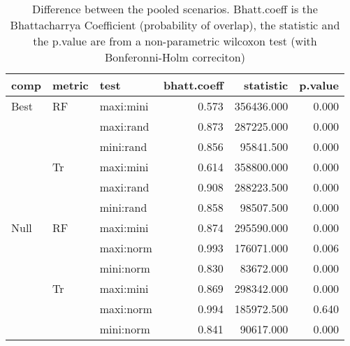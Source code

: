 \begin{table}[ht]
\centering
\begin{tabular}{lllrrr}
  \hline
comp & metric & test & bhatt.coeff & statistic & p.value \\ 
  \hline
Best & RF & maxi:mini & 0.573 & 356436.000 & 0.000 \\ 
   &  & maxi:rand & 0.873 & 287225.000 & 0.000 \\ 
   &  & mini:rand & 0.856 & 95841.500 & 0.000 \\ 
   & Tr & maxi:mini & 0.614 & 358800.000 & 0.000 \\ 
   &  & maxi:rand & 0.908 & 288223.500 & 0.000 \\ 
   &  & mini:rand & 0.858 & 98507.500 & 0.000 \\ 
  Null & RF & maxi:mini & 0.874 & 295590.000 & 0.000 \\ 
   &  & maxi:norm & 0.993 & 176071.000 & 0.006 \\ 
   &  & mini:norm & 0.830 & 83672.000 & 0.000 \\ 
   & Tr & maxi:mini & 0.869 & 298342.000 & 0.000 \\ 
   &  & maxi:norm & 0.994 & 185972.500 & 0.640 \\ 
   &  & mini:norm & 0.841 & 90617.000 & 0.000 \\ 
   \hline
\end{tabular}
\caption{Difference between the pooled scenarios. Bhatt.coeff is the Bhattacharrya Coefficient (probability of overlap), the statistic and the p.value are from a non-parametric wilcoxon test (with Bonferonni-Holm correciton)} 
\label{Full_Tab_pooledscenarios_test}
\end{table}
